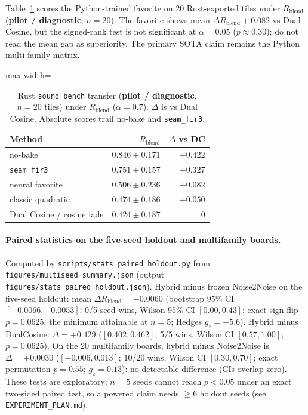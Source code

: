 Table~\ref{tab:rust-bench} scores the Python-trained favorite on 20 Rust-exported tiles under $R_{\mathrm{blend}}$ (\textbf{pilot / diagnostic}; $n{=}20$).
The favorite shows mean $\Delta R_{\mathrm{blend}}{+}0.082$ vs Dual Cosine, but the signed-rank test is not significant at $\alpha{=}0.05$ ($p{\approx}0.30$); do not read the mean gap as superiority.
The primary SOTA claim remains the Python multi-family matrix.

\begin{table}[t]
  \centering
  \caption{Rust \texttt{sound\_bench} transfer (\textbf{pilot / diagnostic}, $n{=}20$ tiles) under $R_{\mathrm{blend}}$ ($\alpha{=}0.7$).
  $\Delta$ is vs Dual Cosine. Absolute scores trail no-bake and \texttt{seam\_fir3}.}
  \label{tab:rust-bench}
  \setlength{\tabcolsep}{6pt}
  \begin{adjustbox}{max width=\columnwidth}
\begin{tabular}{@{}lrr@{}}
    \toprule
    Method & $R_{\mathrm{blend}}$ & $\Delta$ vs DC \\
    \midrule
    no-bake & $0.846\pm0.171$ & ${+}0.422$ \\
    \texttt{seam\_fir3} & $0.751\pm0.157$ & ${+}0.327$ \\
    neural favorite & $0.506\pm0.236$ & ${+}0.082$ \\
    classic quadratic & $0.474\pm0.186$ & ${+}0.050$ \\
    Dual Cosine / cosine fade & $0.424\pm0.187$ & $0$ \\
    \bottomrule
  \end{tabular}
\end{adjustbox}
\end{table}

\paragraph{Paired statistics on the five-seed holdout and multifamily boards.}
Computed by \texttt{scripts/stats\_paired\_holdout.py} from \texttt{figures/multiseed\_summary.json} (output \texttt{figures/stats\_paired\_holdout.json}).
Hybrid minus frozen Noise2Noise on the five-seed holdout: mean $\Delta R_{\mathrm{blend}}={-}0.0060$ (bootstrap 95\% CI $[{-}0.0066,{-}0.0053]$; 0/5 seed wins, Wilson 95\% CI $[0.00,0.43]$; exact sign-flip $p=0.0625$, the minimum attainable at $n{=}5$; Hedges $g_z={-}5.6$).
Hybrid minus DualCosine: $\Delta={+}0.429$ ($[0.402,0.462]$; 5/5 wins, Wilson CI $[0.57,1.00]$; $p=0.0625$).
On the 20 multifamily boards, hybrid minus Noise2Noise is $\Delta={+}0.0030$ ($[{-}0.006,0.013]$; 10/20 wins, Wilson CI $[0.30,0.70]$; exact permutation $p=0.55$; $g_z=0.13$): no detectable difference (CIs overlap zero).
These tests are exploratory; $n{=}5$ seeds cannot reach $p<0.05$ under an exact two-sided paired test, so a powered claim needs $\ge 6$ holdout seeds (see \texttt{EXPERIMENT\_PLAN.md}).
